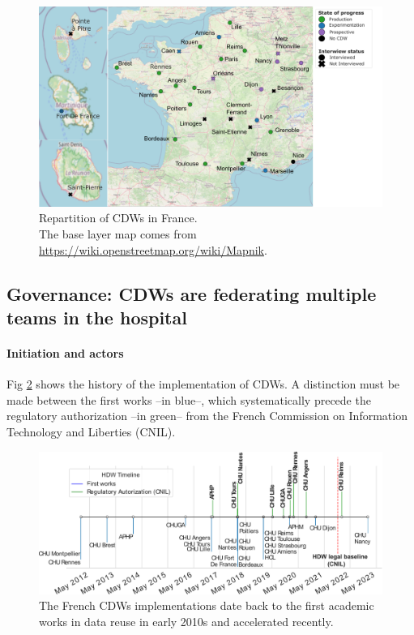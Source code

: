 \documentclass[french,12pt,twoside,a4paper]{book}
\begin{document}
\begin{figure}[!b]
  \centering
  \includegraphics[width=0.82\linewidth]{img/chapter_2/Fig2_thesis.pdf}
  \caption{Repartition of CDWs in France. \\The base layer map comes from
    \url{https://wiki.openstreetmap.org/wiki/Mapnik}.}
  \label{results:image:eds_map}
\end{figure}


\subsection{Governance: CDWs are federating multiple teams in the hospital}%
\label{subsec:cdw:results:governance}%

\paragraph{Initiation and actors}


Fig \ref{results:governance:image:timeline} shows the history of the
implementation of CDWs. A distinction must be made between the first works --in
blue--, which systematically precede the regulatory authorization --in green--
from the French Commission on Information Technology and Liberties (CNIL).

\begin{figure}
  \centering
  \includegraphics[width=\linewidth]{img/chapter_2/Fig3.pdf}
  \caption{The French CDWs implementations date back to the first academic works in data reuse in early 2010s and accelerated recently.}
  \label{results:governance:image:timeline}
\end{figure}
\end{document}
